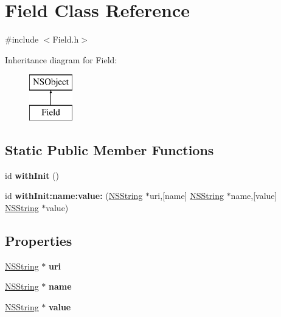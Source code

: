 \hypertarget{interface_field}{
\section{\-Field \-Class \-Reference}
\label{interface_field}
}


{\ttfamily \#include $<$\-Field.\-h$>$}

\-Inheritance diagram for \-Field\-:\begin{figure}[H]
\begin{center}
\leavevmode
\includegraphics[height=2.000000cm]{interface_field}
\end{center}
\end{figure}
\subsection*{\-Static \-Public \-Member \-Functions}
\begin{DoxyCompactItemize}
\item 
\hypertarget{interface_field_aa0306035117ddda530bd62ca75f55011}{
id {\bfseries with\-Init} ()}
\label{interface_field_aa0306035117ddda530bd62ca75f55011}

\item 
\hypertarget{interface_field_a2ee6f2119b80ab20893f438dfa1893bb}{
id {\bfseries with\-Init\-:name\-:value\-:} (\hyperlink{class_n_s_string}{\-N\-S\-String} $\ast$uri,\mbox{[}name\mbox{]} \hyperlink{class_n_s_string}{\-N\-S\-String} $\ast$name,\mbox{[}value\mbox{]} \hyperlink{class_n_s_string}{\-N\-S\-String} $\ast$value)}
\label{interface_field_a2ee6f2119b80ab20893f438dfa1893bb}

\end{DoxyCompactItemize}
\subsection*{\-Properties}
\begin{DoxyCompactItemize}
\item 
\hypertarget{interface_field_a5f4eb4c4b330ca322fe03ad691c9aa2e}{
\hyperlink{class_n_s_string}{\-N\-S\-String} $\ast$ {\bfseries uri}}
\label{interface_field_a5f4eb4c4b330ca322fe03ad691c9aa2e}

\item 
\hypertarget{interface_field_ae019697dbae6077ad6f11e2b8aa32b7a}{
\hyperlink{class_n_s_string}{\-N\-S\-String} $\ast$ {\bfseries name}}
\label{interface_field_ae019697dbae6077ad6f11e2b8aa32b7a}

\item 
\hypertarget{interface_field_a2e6db10b66c8a1586a6cf24847434456}{
\hyperlink{class_n_s_string}{\-N\-S\-String} $\ast$ {\bfseries value}}
\label{interface_field_a2e6db10b66c8a1586a6cf24847434456}

\end{DoxyCompactItemize}


